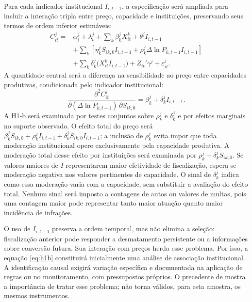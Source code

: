 Para cada indicador institucional $I_{i,t-1}$, a especificação será ampliada para incluir a interação tripla entre preço, capacidade e instituições, preservando seus termos de ordem inferior estimáveis:
\begin{equation}
 \begin{split}
 C_{it}^{j}={}&\alpha_i^{j}+\lambda_t^{j}
 +\sum_k\beta_k^{j}X_{it}^{k}+\theta^{j}I_{i,t-1}\\
 &+\sum_k\left[\eta_k^{j}S_{ik,0}I_{i,t-1}
       +\rho_k^{j}\Delta\ln P_{k,t-1}I_{i,t-1}\right]\\
 &+\sum_k\delta_k^{j}\bigl(X_{it}^{k}I_{i,t-1}\bigr)
 +Z_{it}'\gamma^{j}+\varepsilon_{it}^{j}.
 \end{split}
 \label{eq:h1b}
\end{equation}
A quantidade central será a diferença na sensibilidade ao preço entre capacidades produtivas, condicionada pelo indicador institucional:
\begin{equation}
 \frac{\partial^2 C_{it}^{j}}
 {\partial(\Delta\ln P_{k,t-1})\,\partial S_{ik,0}}
 =\beta_k^{j}+\delta_k^{j}I_{i,t-1}.
 \label{eq:marginal}
\end{equation}
A H1-b será examinada por testes conjuntos sobre $\rho_k^{j}$ e $\delta_k^{j}$ e por efeitos marginais no suporte observado. O efeito total do preço será $\beta_k^{j}S_{ik,0}+\rho_k^{j}I_{i,t-1}+\delta_k^{j}S_{ik,0}I_{i,t-1}$; a inclusão de $\rho_k^{j}$ evita impor que toda moderação institucional opere exclusivamente pela capacidade produtiva. A moderação total desse efeito por instituições será examinada por $\rho_k^{j}+\delta_k^{j}S_{ik,0}$. Se valores maiores de $I$ representarem maior efetividade de fiscalização, espera-se moderação negativa nos valores pertinentes de capacidade. O sinal de $\delta_k^{j}$ indica como essa moderação varia com a capacidade, sem substituir a avaliação do efeito total. Nenhum sinal será imposto a contagens de autos ou valores de multas, pois uma contagem maior pode representar tanto maior atuação quanto maior incidência de infrações.

O uso de $I_{i,t-1}$ preserva a ordem temporal, mas não elimina a seleção: fiscalização anterior pode responder a desmatamento persistente ou a informações sobre conversão futura. Sua interação com preços herda esse problema. Por isso, a equação \ref{eq:h1b} constituirá inicialmente uma análise de associação institucional. A identificação causal exigirá variação específica e documentada na aplicação de regras ou no monitoramento, com pressupostos próprios. O precedente de  mostra a importância de tratar esse problema; não torna válidos, para esta amostra, os mesmos instrumentos.

